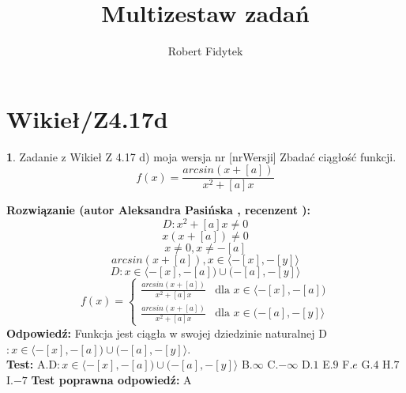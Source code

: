 \documentclass[12pt, a4paper]{article}
\title{Multizestaw zadań}
\author{Robert Fidytek}
\date{}
\theoremstyle{definition} %
\newtheorem{zad}{}
\newcommand{\kategoria}[1]{\section{#1}} %
\newcommand{\zadStart}[1]{\begin{zad}#1\newline} %
\newcommand{\zadStop}{\end{zad}}   %
\newcommand{\rozwStart}[2]{\noindent \textbf{Rozwiązanie (autor #1 , recenzent #2): }\newline} %
\newcommand{\rozwStop}{\newline}                                            %
\newcommand{\odpStart}{\noindent \textbf{Odpowiedź:}\newline}    %
\newcommand{\odpStop}{\newline}                                             %
\newcommand{\testStart}{\noindent \textbf{Test:}\newline} %
\newcommand{\testStop}{\newline} %
\newcommand{\kluczStart}{\noindent \textbf{Test poprawna odpowiedź:}\newline} %
\newcommand{\kluczStop}{\newline} %
\begin{document}
\maketitle


\kategoria{Wikieł/Z4.17d}
\zadStart{Zadanie z Wikieł Z 4.17 d) moja wersja nr [nrWersji]}
Zbadać ciągłość funkcji. $$f(x)=\frac{arcsin(x+[a])}{x^2+[a]x}$$
\zadStop
\rozwStart{Aleksandra Pasińska}{}
$$D:x^2+[a]x\neq 0$$
$$x(x+[a])\neq0$$
$$x\neq0, x\neq-[a]$$
$$arcsin(x+[a]),x\in\langle-[x],-[y]\rangle$$
$$D:x\in\langle-[x],-[a])\cup(-[a],-[y]\rangle$$
$$f(x)= \left\{ \begin{array}{ll}
\frac{arcsin(x+[a])}{x^2+[a]x} & \textrm{dla $x\in \langle-[x],-[a])$}\\
\frac{arcsin(x+[a])}{x^2+[a]x} & \textrm{dla $x\in (-[a],-[y]\rangle$} 
\end{array} \right.$$
\rozwStop
\odpStart
Funkcja jest ciągła w swojej dziedzinie naturalnej D$:x\in\langle-[x],-[a])\cup(-[a],-[y]\rangle$.\\
\odpStop
\testStart
A.D$:x\in\langle-[x],-[a])\cup(-[a],-[y]\rangle$
B.$\infty$
C.$-\infty$
D.$1$
E.$9$
F.$e$
G.$4$
H.$7$
I.$-7$
\testStop
\kluczStart
A
\kluczStop
\end{document}
